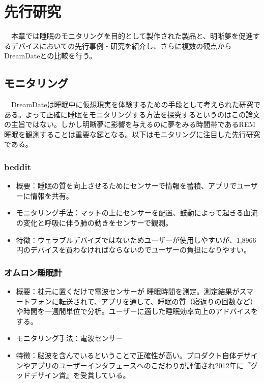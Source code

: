 \chapter{先行研究}
\label{chap:search}
　本章では睡眠のモニタリングを目的として製作された製品と、明晰夢を促進するデバイスにおいての先行事例・研究を紹介し、さらに複数の観点からDreamDateとの比較を行う。\\

\section{モニタリング}
　DreamDateは睡眠中に仮想現実を体験するための手段として考えられた研究である。よって正確に睡眠をモニタリングする方法を探究するというのはこの論文の主旨ではない。しかし明晰夢に影響を与えるのに夢をみる時間帯であるREM睡眠を観測することは重要な鍵となる。以下はモニタリングに注目した先行研究である。

\subsection{beddit}
\begin{itemize}
\item 概要：睡眠の質を向上させるためにセンサーで情報を蓄積、アプリでユーザーに情報を共有。
\item モニタリング手法：マットの上にセンサーを配置、鼓動によって起きる血流の変化と呼吸に伴う肺の動きをセンサーで観測。\cite{beddit}
\item 特徴：ウェラブルデバイズではないためユーザーが使用しやすいが、1,8966円のデバイスを買わなければならないのでユーザーの負担になりやすい。
\end{itemize}

\subsection{オムロン睡眠計}
\begin{itemize}
\item 概要：枕元に置くだけで電波センサーが 睡眠時間を測定。測定結果がスマートフォンに転送されて、アプリを通して、睡眠の質（寝返りの回数など）や時間を一週間単位で分析。ユーザーに適した睡眠効率向上のアドバイスをする。
\item モニタリング手法：電波センサー\cite{omron}
\item 特徴：脳波を含んでいるということで正確性が高い。プロダクト自体デザインやアプリのユーザーインタフェースへのこだわりが評価され2012年に『グッドデザイン賞』を受賞している。
\end{itemize}

